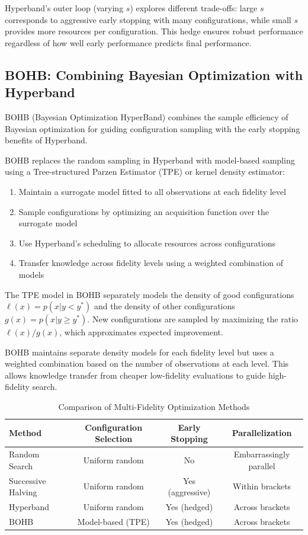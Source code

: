 Hyperband's outer loop (varying $s$) explores different trade-offs: large $s$ corresponds to aggressive early stopping with many configurations, while small $s$ provides more resources per configuration. This hedge ensures robust performance regardless of how well early performance predicts final performance.

\subsection{BOHB: Combining Bayesian Optimization with Hyperband}
\label{subsec:bohb}

BOHB (Bayesian Optimization HyperBand) combines the sample efficiency of Bayesian optimization for guiding configuration sampling with the early stopping benefits of Hyperband.

\begin{definition}[BOHB]
\label{def:bohb}
BOHB replaces the random sampling in Hyperband with model-based sampling using a Tree-structured Parzen Estimator (TPE) or kernel density estimator:
\begin{enumerate}
\item Maintain a surrogate model fitted to all observations at each fidelity level
\item Sample configurations by optimizing an acquisition function over the surrogate model
\item Use Hyperband's scheduling to allocate resources across configurations
\item Transfer knowledge across fidelity levels using a weighted combination of models
\end{enumerate}
\end{definition}

The TPE model in BOHB separately models the density of good configurations $\ell(x) = p(x | y < y^*)$ and the density of other configurations $g(x) = p(x | y \geq y^*)$. New configurations are sampled by maximizing the ratio $\ell(x)/g(x)$, which approximates expected improvement.

BOHB maintains separate density models for each fidelity level but uses a weighted combination based on the number of observations at each level. This allows knowledge transfer from cheaper low-fidelity evaluations to guide high-fidelity search.

\begin{table}[htbp]
\centering
\caption{Comparison of Multi-Fidelity Optimization Methods}
\label{tab:multi_fidelity}
\begin{tabular}{lccc}
\toprule
\textbf{Method} & \textbf{Configuration Selection} & \textbf{Early Stopping} & \textbf{Parallelization} \\
\midrule
Random Search & Uniform random & No & Embarrassingly parallel \\
Successive Halving & Uniform random & Yes (aggressive) & Within brackets \\
Hyperband & Uniform random & Yes (hedged) & Across brackets \\
BOHB & Model-based (TPE) & Yes (hedged) & Across brackets \\
\bottomrule
\end{tabular}
\end{table}

